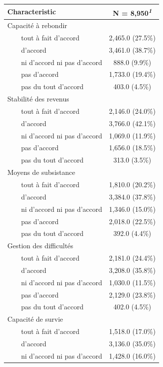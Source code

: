 \documentclass[
]{article}
\begin{document}
\begin{table}[!t]
\fontsize{9.8pt}{11.7pt}\selectfont
\begin{tabular*}{\linewidth}{@{\extracolsep{\fill}}lc}
\toprule
\textbf{Characteristic} & \textbf{N = 8,950}\textsuperscript{\textit{1}} \\ 
\midrule\addlinespace[2.5pt]
Capacité à rebondir &  \\ 
    tout à fait d'accord & 2,465.0 (27.5\%) \\ 
    d'accord & 3,461.0 (38.7\%) \\ 
    ni d'accord ni pas d'accord & 888.0 (9.9\%) \\ 
    pas d'accord & 1,733.0 (19.4\%) \\ 
    pas du tout d'accord & 403.0 (4.5\%) \\ 
Stabilité des revenus &  \\ 
    tout à fait d'accord & 2,146.0 (24.0\%) \\ 
    d'accord & 3,766.0 (42.1\%) \\ 
    ni d'accord ni pas d'accord & 1,069.0 (11.9\%) \\ 
    pas d'accord & 1,656.0 (18.5\%) \\ 
    pas du tout d'accord & 313.0 (3.5\%) \\ 
Moyens de subsistance &  \\ 
    tout à fait d'accord & 1,810.0 (20.2\%) \\ 
    d'accord & 3,384.0 (37.8\%) \\ 
    ni d'accord ni pas d'accord & 1,346.0 (15.0\%) \\ 
    pas d'accord & 2,018.0 (22.5\%) \\ 
    pas du tout d'accord & 392.0 (4.4\%) \\ 
Gestion des difficultés &  \\ 
    tout à fait d'accord & 2,181.0 (24.4\%) \\ 
    d'accord & 3,208.0 (35.8\%) \\ 
    ni d'accord ni pas d'accord & 1,030.0 (11.5\%) \\ 
    pas d'accord & 2,129.0 (23.8\%) \\ 
    pas du tout d'accord & 402.0 (4.5\%) \\ 
Capacité de survie &  \\ 
    tout à fait d'accord & 1,518.0 (17.0\%) \\ 
    d'accord & 3,136.0 (35.0\%) \\ 
    ni d'accord ni pas d'accord & 1,428.0 (16.0\%) \\ 

\end{tabular*}
\end{table}
\end{document}
